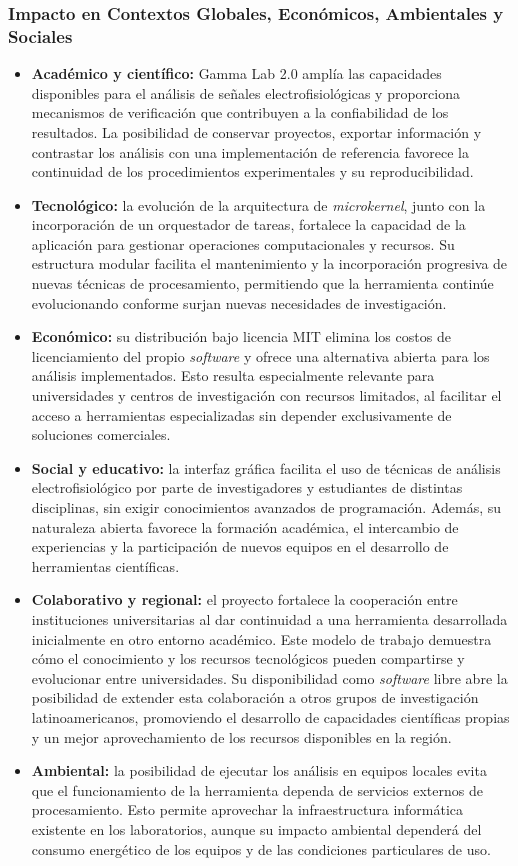 \documentclass[12pt,letterpaper,oneside]{article}
\begin{document}
\subsubsection{Impacto en Contextos Globales, Económicos, Ambientales y Sociales}

\begin{itemize}
  \item \textbf{Académico y científico:} Gamma Lab 2.0 amplía las capacidades disponibles para el análisis de señales electrofisiológicas y proporciona mecanismos de verificación que contribuyen a la confiabilidad de los resultados. La posibilidad de conservar proyectos, exportar información y contrastar los análisis con una implementación de referencia favorece la continuidad de los procedimientos experimentales y su reproducibilidad.
  \item \textbf{Tecnológico:} la evolución de la arquitectura de \textit{microkernel}, junto con la incorporación de un orquestador de tareas, fortalece la capacidad de la aplicación para gestionar operaciones computacionales y recursos. Su estructura modular facilita el mantenimiento y la incorporación progresiva de nuevas técnicas de procesamiento, permitiendo que la herramienta continúe evolucionando conforme surjan nuevas necesidades de investigación.
  \item \textbf{Económico:} su distribución bajo licencia MIT elimina los costos de licenciamiento del propio \textit{software} y ofrece una alternativa abierta para los análisis implementados. Esto resulta especialmente relevante para universidades y centros de investigación con recursos limitados, al facilitar el acceso a herramientas especializadas sin depender exclusivamente de soluciones comerciales.
  \item \textbf{Social y educativo:} la interfaz gráfica facilita el uso de técnicas de análisis electrofisiológico por parte de investigadores y estudiantes de distintas disciplinas, sin exigir conocimientos avanzados de programación. Además, su naturaleza abierta favorece la formación académica, el intercambio de experiencias y la participación de nuevos equipos en el desarrollo de herramientas científicas.
  \item \textbf{Colaborativo y regional:} el proyecto fortalece la cooperación entre instituciones universitarias al dar continuidad a una herramienta desarrollada inicialmente en otro entorno académico. Este modelo de trabajo demuestra cómo el conocimiento y los recursos tecnológicos pueden compartirse y evolucionar entre universidades. Su disponibilidad como \textit{software} libre abre la posibilidad de extender esta colaboración a otros grupos de investigación latinoamericanos, promoviendo el desarrollo de capacidades científicas propias y un mejor aprovechamiento de los recursos disponibles en la región.
  \item \textbf{Ambiental:} la posibilidad de ejecutar los análisis en equipos locales evita que el funcionamiento de la herramienta dependa de servicios externos de procesamiento. Esto permite aprovechar la infraestructura informática existente en los laboratorios, aunque su impacto ambiental dependerá del consumo energético de los equipos y de las condiciones particulares de uso.
\end{itemize}
\end{document}
